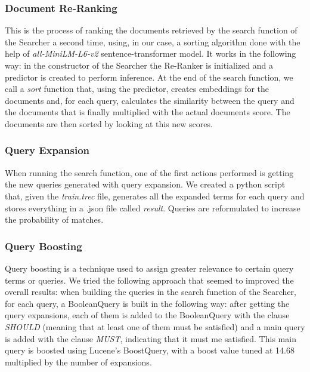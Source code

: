 \subsubsection{Document Re-Ranking}
This is the process of ranking the documents retrieved by the search function of the Searcher a second time, using, in our case, a sorting algorithm done with the help of \textit{all-MiniLM-L6-v2} sentence-transformer model.
\newline
It works in the following way: in the constructor of the Searcher the Re-Ranker is initialized and a predictor is created to perform inference. At the end of the search function, we call a \textit{sort} function that, using the predictor, creates embeddings for the documents and, for each query, calculates the similarity between the query and the documents that is finally multiplied with the actual documents score. The documents are then sorted by looking at this new scores.


\subsubsection{Query Expansion}
When running the search function, one of the first actions performed is getting the new queries generated with query expansion.
We created a python script that, given the \textit{train.trec} file, generates all the expanded terms for each query and stores everything in a .json file called \textit{result}.
\newline
Queries are reformulated to increase the probability of matches.


\subsubsection{Query Boosting}
Query boosting is a technique used to assign greater relevance to certain query terms or queries.\newline
We tried the following approach that seemed to improved the overall results: when building the queries in the search function of the Searcher, for each query, a BooleanQuery is built in the following way: after getting the query expansions, each of them is added to the BooleanQuery with the clause \textit{SHOULD} (meaning that at least one of them must be satisfied) and a main query is added with the clause \textit{MUST}, indicating that it must me satisfied. This main query is boosted using Lucene's BoostQuery, with a boost value tuned at 14.68 multiplied by the number of expansions.
